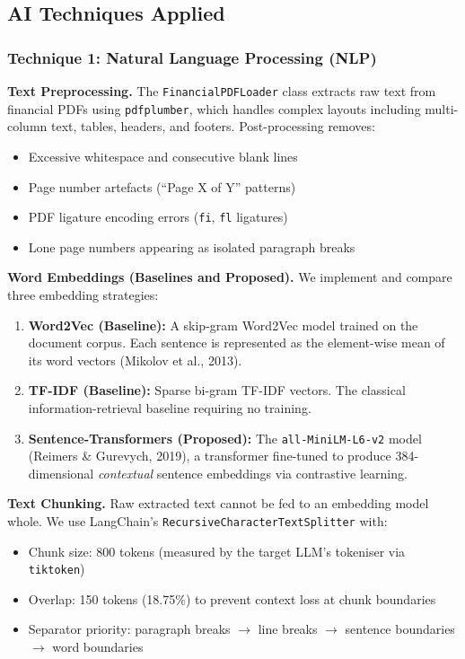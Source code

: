 \documentclass[12pt,a4paper]{article}
\begin{document}
\subsection{AI Techniques Applied}

\subsubsection{Technique 1: Natural Language Processing (NLP)}

\textbf{Text Preprocessing.}
The \texttt{FinancialPDFLoader} class extracts raw text from financial PDFs using \texttt{pdfplumber}, which handles complex layouts including multi-column text, tables, headers, and footers. Post-processing removes:
\begin{itemize}[noitemsep]
  \item Excessive whitespace and consecutive blank lines
  \item Page number artefacts (``Page X of Y'' patterns)
  \item PDF ligature encoding errors (\texttt{fi}, \texttt{fl} ligatures)
  \item Lone page numbers appearing as isolated paragraph breaks
\end{itemize}

\textbf{Word Embeddings (Baselines and Proposed).}
We implement and compare three embedding strategies:
\begin{enumerate}[leftmargin=*, noitemsep]
  \item \textbf{Word2Vec (Baseline):} A skip-gram Word2Vec model trained on the document corpus. Each sentence is represented as the element-wise mean of its word vectors (Mikolov et al., 2013).
  \item \textbf{TF-IDF (Baseline):} Sparse bi-gram TF-IDF vectors. The classical information-retrieval baseline requiring no training.
  \item \textbf{Sentence-Transformers (Proposed):} The \texttt{all-Mini\-LM-L6-v2} model (Reimers \& Gurevych, 2019), a transformer fine-tuned to produce 384-dimensional \textit{contextual} sentence embeddings via contrastive learning.
\end{enumerate}

\textbf{Text Chunking.}
Raw extracted text cannot be fed to an embedding model whole. We use LangChain's \texttt{Recursive\-Character\-Text\-Splitter} with:
\begin{itemize}[noitemsep]
  \item Chunk size: 800 tokens (measured by the target LLM's tokeniser via \texttt{tiktoken})
  \item Overlap: 150 tokens (18.75\%) to prevent context loss at chunk boundaries
  \item Separator priority: paragraph breaks $\rightarrow$ line breaks $\rightarrow$ sentence boundaries $\rightarrow$ word boundaries
\end{itemize}
\end{document}

